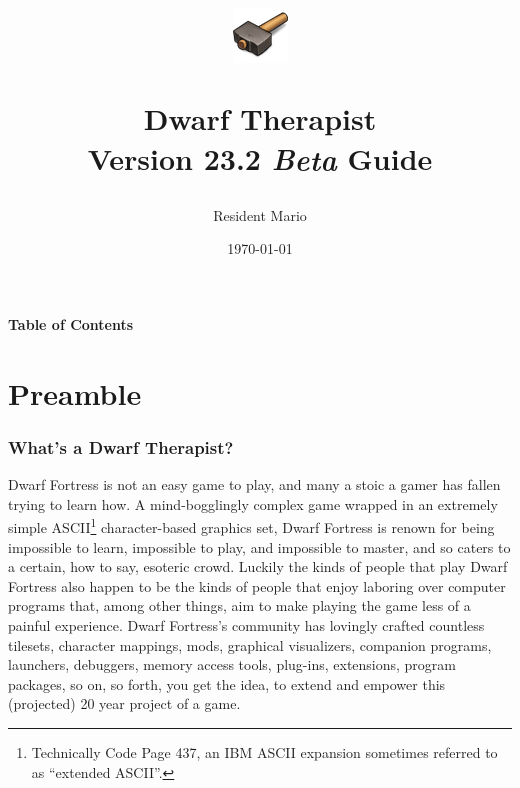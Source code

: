 \documentclass[]{article}
\begin{document}

\title{ \begin{figure}[h!] \centering \includegraphics[scale=.8]{logo}
\end{figure}
\textbf{Dwarf Therapist}\\Version 23.2 \emph{Beta} Guide}
\author{Resident Mario}
\date{\today}
\maketitle

\newpage
{}
\begin{center}
\textbf{Table of Contents}
\end{center}
\tableofcontents
\newpage

\part{Preamble}
\section{What's a Dwarf Therapist?}

Dwarf Fortress is not an easy game to play, and many a stoic a gamer has fallen trying to learn how. A
mind-bogglingly complex game wrapped in an extremely simple ASCII\footnote{Technically Code Page 437, an
IBM ASCII expansion sometimes referred to as ``extended ASCII''.} character-based graphics set, Dwarf
Fortress is renown for being impossible to learn, impossible to play, and impossible to master, and so
caters to a certain, how to say, esoteric crowd.
Luckily the kinds of people that play Dwarf Fortress also happen to be the kinds of people that enjoy
laboring over computer programs that, among other things, aim to make playing the game less of a painful
experience. Dwarf Fortress's community has lovingly crafted countless tilesets, character
mappings, mods, graphical visualizers, companion programs, launchers, debuggers, memory access tools,
plug-ins, extensions, program packages, so on, so forth, you get the idea, to extend and empower this
(projected) 20 year project of a game.
\end{document}
